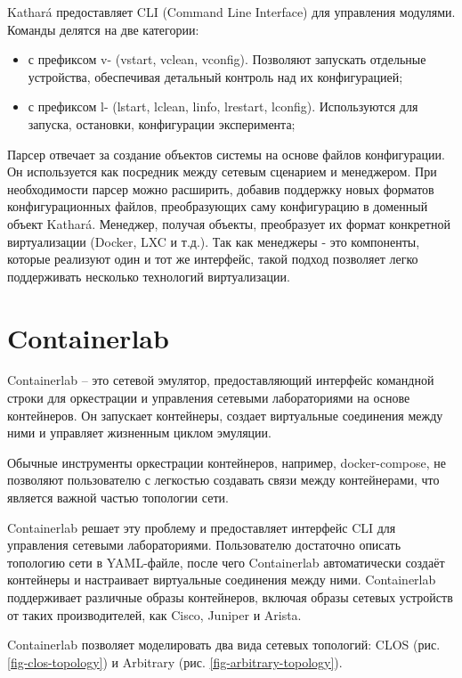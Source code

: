 \documentclass[
  english,
  russian,
  12pt,
  a4paper,
]{phdthesr}
\providecommand{\tightlist}{%
  \setlength{\itemsep}{0pt}\setlength{\parskip}{0pt}}
\begin{document}
Kathará предоставляет CLI (Command Line Interface) для управления
модулями. Команды делятся на две категории:

\begin{itemize}
\tightlist
\item
  с префиксом v- (vstart, vclean, vconfig). Позволяют запускать
  отдельные устройства, обеспечивая детальный контроль над их
  конфигурацией;
\item
  с префиксом l- (lstart, lclean, linfo, lrestart, lconfig).
  Используются для запуска, остановки, конфигурации эксперимента;
\end{itemize}

Парсер отвечает за создание объектов системы на основе файлов
конфигурации. Он используется как посредник между сетевым сценарием и
менеджером. При необходимости парсер можно расширить, добавив поддержку
новых форматов конфигурационных файлов, преобразующих саму конфигурацию
в доменный объект Kathará. Менеджер, получая объекты, преобразует их
формат конкретной виртуализации (Docker, LXC и т.д.). Так как менеджеры
- это компоненты, которые реализуют один и тот же интерфейс, такой
подход позволяет легко поддерживать несколько технологий виртуализации.

\section{Containerlab}\label{containerlab}

Containerlab -- это сетевой эмулятор, предоставляющий интерфейс
командной строки для оркестрации и управления сетевыми лабораториями на
основе контейнеров. Он запускает контейнеры, создает виртуальные
соединения между ними и управляет жизненным циклом эмуляции.

Обычные инструменты оркестрации контейнеров, например, docker-compose,
не позволяют пользователю с легкостью создавать связи между
контейнерами, что является важной частью топологии сети.

Containerlab решает эту проблему и предоставляет интерфейс CLI для
управления сетевыми лабораториями. Пользователю достаточно описать
топологию сети в YAML-файле, после чего Containerlab автоматически
создаёт контейнеры и настраивает виртуальные соединения между ними.
Containerlab поддерживает различные образы контейнеров, включая образы
сетевых устройств от таких производителей, как Cisco, Juniper и Arista.

Containerlab позволяет моделировать два вида сетевых топологий: CLOS
(рис. \ref{fig-clos-topology}) и Arbitrary (рис.
\ref{fig-arbitrary-topology}).
\end{document}
